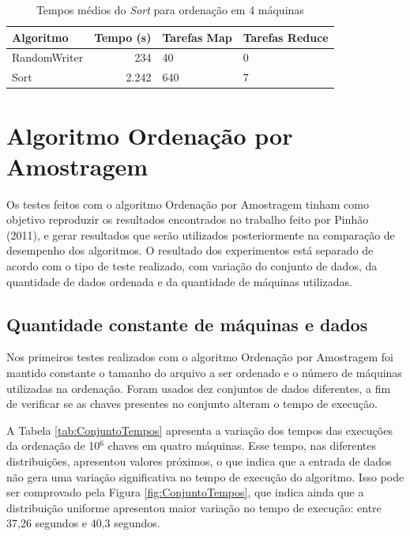 \begin{table}[htbp]
\centering
\begin{footnotesize}
\begin{tabular}{|B|R{3}} \hline
Algoritmo 		&Tempo (s) 	&Tarefas Map 	&Tarefas Reduce			\\ \hline \hline
RandomWriter 	&234			&40				&0						\\ \hline 
Sort				&2.242		&640				&7						\\ \hline 
\end{tabular}
\end{footnotesize}
\caption{Tempos médios do \textit{Sort} para ordenação em 4 máquinas}
\label{tab:Sort}
\end{table}

\section{Algoritmo Ordenação por Amostragem}

Os testes feitos com o algoritmo Ordenação por Amostragem tinham como objetivo reproduzir os resultados encontrados no trabalho feito por Pinhão (2011), e gerar resultados 
que serão utilizados posteriormente na comparação de desempenho dos algoritmos. 
O resultado dos experimentos está separado de acordo com o tipo de teste realizado, com variação do conjunto de dados, da quantidade de dados ordenada e da quantidade de máquinas utilizadas. 


\subsection{Quantidade constante de máquinas e dados}
Nos primeiros testes realizados com o algoritmo Ordenação por Amostragem foi mantido constante o tamanho do arquivo a ser ordenado e o número de máquinas utilizadas na ordenação. Foram usados dez conjuntos de dados diferentes, a fim de verificar se as chaves presentes no conjunto alteram o tempo de execução. 


A Tabela \ref{tab:ConjuntoTempos} apresenta a variação dos tempos das execuções da ordenação de 10$^6$ chaves em quatro máquinas. 
Esse tempo, nas diferentes distribuições, apresentou valores próximos, o que indica que a entrada de dados não gera uma variação significativa no tempo de execução do algoritmo. Isso pode ser comprovado pela Figura \ref{fig:ConjuntoTempos}, que indica ainda que a distribuição uniforme apresentou maior variação no tempo de execução: entre 37,26 segundos e 40,3 segundos.

